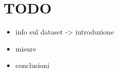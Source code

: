 \chapter{TODO}
\begin{itemize}
	\item info sul dataset -> introduzione
	\item misure
	\item conclusioni
\end{itemize}